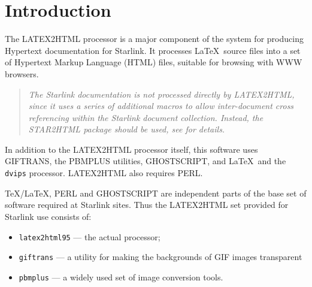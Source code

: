 \stardocabstract
 \newpage
 \begin{latexonly}
   \setlength{\parskip}{0mm}
   \latexonlytoc
   \setlength{\parskip}{\medskipamount}
   \markright{\stardocname}
 \end{latexonly}
\newpage
\renewcommand{\thepage}{\arabic{page}}
\setcounter{page}{1}

\section{Introduction}

The LATEX2HTML processor is a major component of the system for producing
Hypertext documentation for Starlink.  It processes \LaTeX\ source files
into a set of Hypertext Markup Language (HTML) files, suitable for browsing
with WWW browsers.  

\begin{quote}
{\em The Starlink documentation is not processed directly by LATEX2HTML,
since it uses a series of additional macros to allow inter-document
cross referencing within the Starlink document collection.  Instead,
the STAR2HTML package should be used, see  for details.}
\end{quote}

In addition to the LATEX2HTML processor itself, this software uses
GIFTRANS, the PBMPLUS utilities, GHOSTSCRIPT, and \LaTeX\ and the {\tt
dvips} processor.  LATEX2HTML also requires PERL.

\TeX/\LaTeX, PERL and GHOSTSCRIPT are independent parts of the base set
of software required at Starlink sites.  Thus the LATEX2HTML set provided for
Starlink use consists of:

\begin{itemize}

\item {\tt latex2html95} --- the actual processor;

\item {\tt giftrans} --- a utility for making the backgrounds of GIF
images transparent

\item {\tt pbmplus} --- a widely used set of image conversion tools.

\end{itemize}

